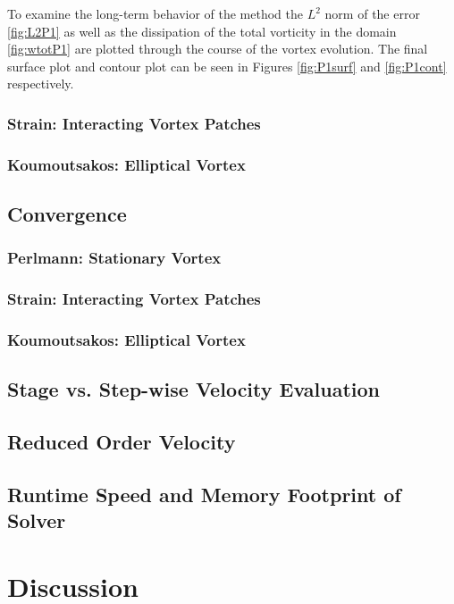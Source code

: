 \documentclass[letterpaper,12pt]{report}
\begin{document}
To examine the long-term behavior of the method the $L^2$ norm of the error \ref{fig:L2P1} as well as the dissipation of the total vorticity in the domain \ref{fig:wtotP1} are plotted through the course of the vortex evolution. The final surface plot and contour plot can be seen in Figures \ref{fig:P1surf} and \ref{fig:P1cont} respectively.

\subsection{Strain: Interacting Vortex Patches}

\subsection{Koumoutsakos: Elliptical Vortex}

\section{Convergence}
\subsection{Perlmann: Stationary Vortex}

\subsection{Strain: Interacting Vortex Patches}

\subsection{Koumoutsakos: Elliptical Vortex}


\section{Stage vs. Step-wise Velocity Evaluation}

\section{Reduced Order Velocity}

\section{Runtime Speed and Memory Footprint of Solver}
\chapter{Discussion}
\end{document}
